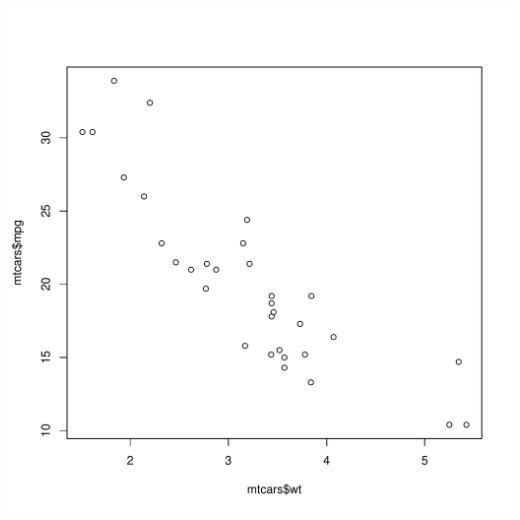\documentclass[11pt]{article}\usepackage[]{graphicx}\usepackage[]{xcolor}
\makeatletter
\def\maxwidth{ %
  \ifdim\Gin@nat@width>\linewidth
    \linewidth
  \else
    \Gin@nat@width
  \fi
}
\newenvironment{knitrout}{}{} %
\makeatother
\begin{document}
\begin{knitrout}
\includegraphics[width=\maxwidth]{figure/Q4-2} 
\end{knitrout}
\end{document}
